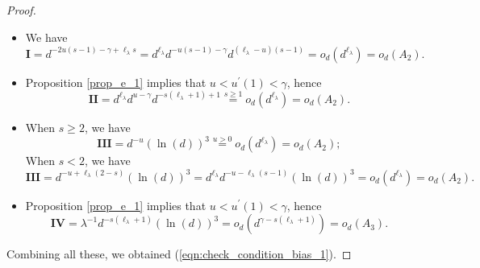 \documentclass{article}
\theoremstyle{plain}
\theoremstyle{definition}
\theoremstyle{remark}
\newcommand{\calN}{\mathcal{N}}
\begin{document}
\begin{appendix}
\begin{proof}
\begin{itemize}
        

    \item We have
    $$
        \mathbf{I}=d^{-2u(s-1) -\gamma +\ell_{\lambda}s} = d^{\ell_{\lambda}} d^{-u(s-1) -\gamma}d^{(\ell_{\lambda}-u)(s-1)} = o_d( d^{\ell_{\lambda}})=o_d(A_2).
    $$

    \item Proposition \ref{prop_e_1} implies that $u < u^{\prime}(1) < \gamma$, hence
    $$
    \mathbf{II} = d^{\ell_{\lambda}}d^{u - \gamma}d^{-s(\ell_{\lambda}+1) + 1} \overset{s \geq 1}{=} o_d( d^{\ell_{\lambda}})=o_d(A_2).
    $$

    \item When $s\geq 2$, we have 
    $$
    \mathbf{III} = d^{-u} (\ln(d))^3 \overset{u>0}{=} o_d( d^{\ell_{\lambda}})=o_d(A_2);
    $$
    When $s<2$, we have
    $$
    \mathbf{III} = d^{-u + \ell_{\lambda}(2-s)} (\ln(d))^3 = d^{\ell_{\lambda}} d^{-u - \ell_{\lambda}(s-1)} (\ln(d))^3 = o_d( d^{\ell_{\lambda}})=o_d(A_2).
    $$
    
    \item Proposition \ref{prop_e_1} implies that $u < u^{\prime}(1) < \gamma$, hence
    $$
    \mathbf{IV}=\lambda^{-1}d^{-s(\ell_{\lambda}+1)}(\ln(d))^3 = o_d( d^{\gamma-s(\ell_{\lambda}+1)} )=o_d(A_3).
    $$
    
\end{itemize}
Combining all these, we obtained (\ref{eqn:check_condition_bias_1}).




\end{proof}
\end{appendix}
\end{document}
